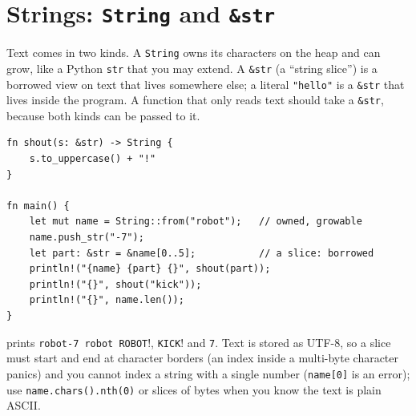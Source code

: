 \begin{center}
\end{center}

\section*{Strings: \texttt{String} and \texttt{\&str}}
Text comes in two kinds. A \verb!String! owns its characters on the heap and can grow, like a Python \verb!str! that you may extend. A \verb!&str! (a ``string slice'') is a borrowed view on text that lives somewhere else; a literal \verb!"hello"! is a \verb!&str! that lives inside the program. A function that only reads text should take a \verb!&str!, because both kinds can be passed to it.
\begin{verbatim}
fn shout(s: &str) -> String {
    s.to_uppercase() + "!"
}

fn main() {
    let mut name = String::from("robot");   // owned, growable
    name.push_str("-7");
    let part: &str = &name[0..5];           // a slice: borrowed
    println!("{name} {part} {}", shout(part));
    println!("{}", shout("kick"));
    println!("{}", name.len());
}
\end{verbatim}
prints \verb!robot-7 robot ROBOT!!, \verb!KICK!! and \verb!7!. Text is stored as UTF-8, so a slice must start and end at character borders (an index inside a multi-byte character panics) and you cannot index a string with a single number (\verb!name[0]! is an error); use \verb!name.chars().nth(0)! or slices of bytes when you know the text is plain ASCII.

